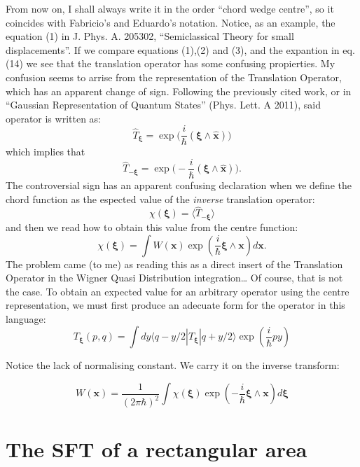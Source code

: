 \documentclass[a4paper,12pt]{article}
\newcommand{\ihb}{\frac{i}{\hbar}}
\newcommand{\xfase}{\mathbf{x}}
\newcommand{\xifase}{ {\boldsymbol{\xi}} }
\newcommand{\bra}[1]{\langle #1|}
\newcommand{\ket}[1]{|#1\rangle}
\begin{document}
From now on, I shall always write it in the order
``chord wedge centre'', so it coincides with Fabricio's and Eduardo's
notation. Notice, as an example, the equation (1) in J. Phys. A.
205302, ``Semiclassical Theory for small displacements''. If we
compare equations (1),(2) and (3), and the expantion
in eq. (14) we see that the translation operator has some
confusing propierties. My confusion seems to arrise from the 
representation of the Translation Operator, which has an apparent
change of sign. Following the previously cited work, or 
in ``Gaussian Representation of Quantum States''  (Phys. Lett. A 2011),
said operator is written as:
\begin{equation}
\hat{T}_\xifase= \exp \big( \ihb (\xifase\wedge\hat{\xfase}) \big)
\end{equation}
which implies that 
\begin{equation}
\hat{T}_{-\xifase}=\exp \big( -\ihb (\xifase\wedge\hat{\xfase}) \big).
\end{equation}
The controversial sign has an apparent confusing declaration
when we define the chord function as the espected value of the
\emph{inverse} translation operator:
\begin{equation}
\chi(\xifase)=\langle \hat{T}_{-\xifase}\rangle
\end{equation}
and then we read how to obtain this value from the centre function:
\begin{equation}
\chi(\xifase)=\int W(\xfase) \exp (\ihb\xifase\wedge\xfase) d\xfase.
\end{equation}
The problem came (to me) as reading this as a direct insert of
the Translation Operator in the Wigner Quasi Distribution integration\ldots
Of course, that is not the case. To obtain an expected value for
an arbitrary operator using the centre representation, we must first
produce an adecuate form for the operator in this language:
\begin{equation}
T_\xifase(p,q)
=\int d y \bra{q-y/2} \hat{T}_\xifase \ket{q +y/2} \exp(\ihb py)
\end{equation}


Notice the lack of normalising constant. We carry it on the inverse
transform:

\begin{equation}
W(\xfase)=\frac{1}{(2 \pi \hbar)^2}
\int \chi(\xifase) \exp (-\ihb\xifase\wedge\xfase) d\xifase
\end{equation}



\section{The SFT of a rectangular area}
\end{document}
